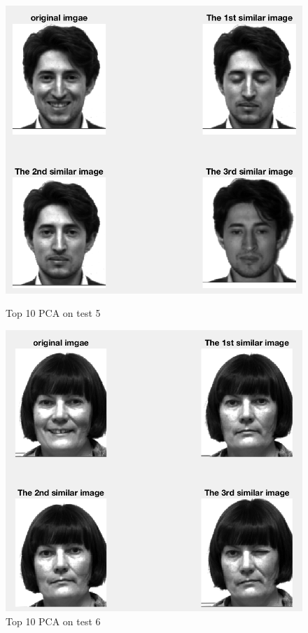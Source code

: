 \documentclass{article}
\begin{document}
\begin{figure}[htbp]
\centering
\begin{minipage}[t]{0.48\textwidth}
\centering
\includegraphics[scale = 0.3]{10_5.png}
\caption{Top 10 PCA on test 5}
\end{minipage}
\begin{minipage}[t]{0.48\textwidth}
\centering
\includegraphics[scale = 0.3]{10_6.png}
\caption{Top 10 PCA on test 6}
\end{minipage}
\end{figure}
\end{document}
